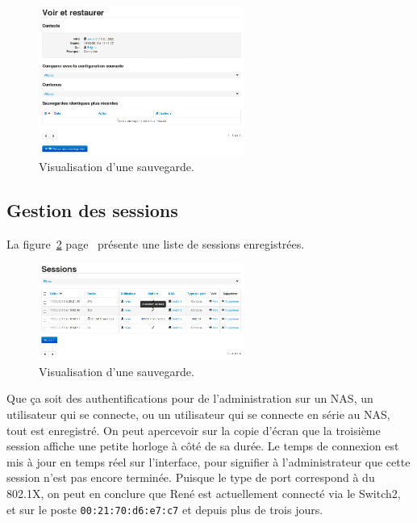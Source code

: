 \begin{figure}[!h]
	\begin{center}
	    \includegraphics[width=0.6\textwidth]{img/backupsview.png}
	\end{center}
	\caption{Visualisation d'une sauvegarde.}
	\label{backupsview}
\end{figure}

\subsection{Gestion des sessions}

La figure~\ref{sessions} page~\pageref{sessions} présente une liste de sessions enregistrées.

\begin{figure}[!h]
	\begin{center}
	    \includegraphics[width=0.6\textwidth]{img/sessions.png}
	\end{center}
	\caption{Visualisation d'une sauvegarde.}
	\label{sessions}
\end{figure}

Que ça soit des authentifications pour de l'administration sur un NAS, un utilisateur qui se connecte, ou un utilisateur qui se connecte en série au NAS, tout est enregistré. On peut apercevoir sur la copie d'écran que la troisième session affiche une petite horloge à côté de sa durée. Le temps de connexion est mis à jour en temps réel sur l'interface, pour signifier à l'administrateur que cette session n'est pas encore terminée. Puisque le type de port correspond à du 802.1X, on peut en conclure que René est actuellement connecté via le Switch2, et sur le  poste \texttt{00:21:70:d6:e7:c7} et depuis plus de trois jours.

